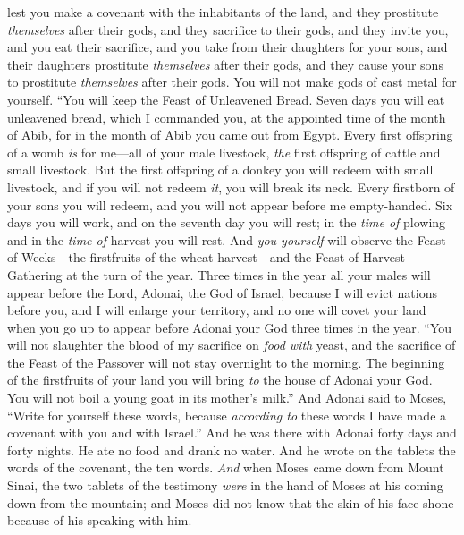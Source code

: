 \begin{biblechapter}
\verse lest you make a covenant with the inhabitants of the land, and they prostitute \textit{themselves} after their gods, and they sacrifice to their gods, and they invite you, and you eat their sacrifice,
\verse and you take from their daughters for your sons, and their daughters prostitute \textit{themselves} after their gods, and they cause your sons to prostitute \textit{themselves} after their gods.
\verse You will not make gods of cast metal for yourself.
\verse “You will keep the Feast of Unleavened Bread. Seven days you will eat unleavened bread, which I commanded you, at the appointed time of the month of Abib, for in the month of Abib you came out from Egypt.
\verse Every first offspring of a womb \textit{is} for me—all of your male livestock, \textit{the} first offspring of cattle and small livestock.
\verse But the first offspring of a donkey you will redeem with small livestock, and if you will not redeem \textit{it}, you will break its neck. Every firstborn of your sons you will redeem, and you will not appear before me empty-handed.
\verse Six days you will work, and on the seventh day you will rest; in the \textit{time of} plowing and in the \textit{time of} harvest you will rest.
\verse And \textit{you yourself} will observe the Feast of Weeks—the firstfruits of the wheat harvest—and the Feast of Harvest Gathering at the turn of the year.
\verse Three times in the year all your males will appear before the Lord, Adonai, the God of Israel,
\verse because I will evict nations before you, and I will enlarge your territory, and no one will covet your land when you go up to appear before Adonai your God three times in the year.
\verse “You will not slaughter the blood of my sacrifice on \textit{food with} yeast, and the sacrifice of the Feast of the Passover will not stay overnight to the morning.
\verse The beginning of the firstfruits of your land you will bring \textit{to} the house of Adonai your God. You will not boil a young goat in its mother’s milk.”
\verse And Adonai said to Moses, “Write for yourself these words, because \textit{according to} these words I have made a covenant with you and with Israel.”
 And he was there with Adonai forty days and forty nights. He ate no food and drank no water. And he wrote on the tablets the words of the covenant, the ten words.
\verse \textit{And} when Moses came down from Mount Sinai, the two tablets of the testimony \textit{were} in the hand of Moses at his coming down from the mountain; and Moses did not know that the skin of his face shone because of his speaking with him.

\end{biblechapter}
